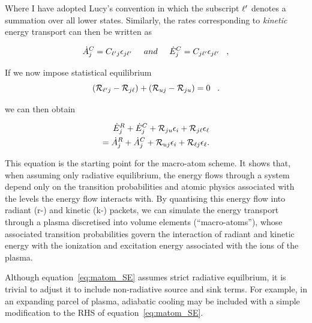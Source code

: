 Where I have adopted Lucy's convention in which the subscript 
$\ell^\prime$ denotes a summation over all lower states.
Similarly, the rates corresponding to {\em kinetic} energy transport can then be written as

\begin{equation}
 \dot{A}_{j}^{C} = C_{\ell^\prime j} \epsilon_{j \ell^\prime} \;\;\;\;\; and
\;\;\;
\;\;  \dot{E}_{j}^{C} = C_{j \ell^\prime} \epsilon_{j \ell^\prime} \;\;\; ,
\end{equation}

If we now impose statistical equilibrium
%
\begin{equation}
 ({\cal R}_{\ell^\prime j}-{\cal R}_{j \ell})+({\cal R}_{uj}-{\cal R}_{ju})=0 \;\;\;.
\end{equation}
 
we can then obtain 

\begin{eqnarray}
 \dot{E}_{j}^{R}+\dot{E}_{j}^{C}+{\cal R}_{ju}\epsilon_{i}+
 {\cal R}_{j \ell}\epsilon_{\ell}  \nonumber \\  
 = \dot{A}_{j}^{R}+\dot{A}_{j}^{C}+{\cal R}_{uj} \epsilon_{i}
 +{\cal R}_{\ell j} \epsilon_{\ell}           .  
 \label{eq:matom_SE}     
\end{eqnarray}

This equation is the starting point for the macro-atom scheme. It shows 
that, when assuming only radiative equilibrium, the energy flows through
a system depend only on the transition probabilities and atomic physics
associated with the levels the energy flow interacts with.
By quantising this energy flow into radiant (r-) and kinetic (k-) packets, 
we can simulate the energy transport through
a plasma discretised into volume elements (``macro-atoms''),
whose associated transition probabilities govern the interaction 
of radiant and kinetic energy with the ionization and excitation energy associated 
with the ions of the plasma.

Although equation~\ref{eq:matom_SE} assumes strict radiative equilbrium,
it is trivial to adjust it to include non-radiative source and sink terms. 
For example, in an expanding parcel of plasma, adiabatic cooling may be 
included with a simple modification to the RHS of equation~\ref{eq:matom_SE}.


